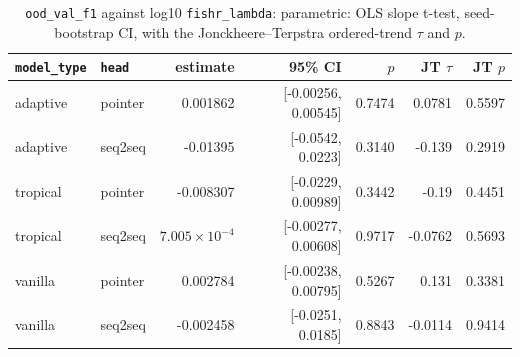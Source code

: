 \documentclass[10pt]{article}
\begin{document}
{\small
\begin{longtable}{llrrrrr}
\caption{\texttt{ood\_val\_f1} against log10 \texttt{fishr\_lambda}: parametric: OLS slope t-test, seed-bootstrap CI, with the Jonckheere--Terpstra ordered-trend $\tau$ and $p$.}\label{tab:trend-ood_val_f1}\\
\toprule
\texttt{model\_type} & \texttt{head} & estimate & 95\% CI & $p$ & JT $\tau$ & JT $p$\\
\midrule
\endhead
adaptive & pointer & 0.001862 & [-0.00256, 0.00545] & 0.7474 & 0.0781 & 0.5597\\
adaptive & seq2seq & -0.01395 & [-0.0542, 0.0223] & 0.3140 & -0.139 & 0.2919\\
tropical & pointer & -0.008307 & [-0.0229, 0.00989] & 0.3442 & -0.19 & 0.4451\\
tropical & seq2seq & $7.005\times10^{-4}$ & [-0.00277, 0.00608] & 0.9717 & -0.0762 & 0.5693\\
vanilla & pointer & 0.002784 & [-0.00238, 0.00795] & 0.5267 & 0.131 & 0.3381\\
vanilla & seq2seq & -0.002458 & [-0.0251, 0.0185] & 0.8843 & -0.0114 & 0.9414\\
\bottomrule
\end{longtable}
}
\end{document}
